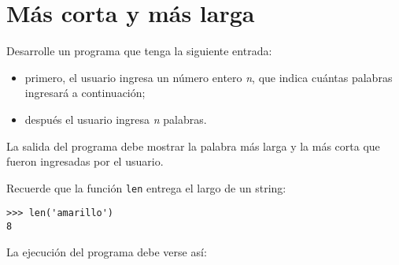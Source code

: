 \section{Más corta y más larga}

Desarrolle un programa que tenga la siguiente entrada:

\begin{itemize}
\item
  primero, el usuario ingresa un número entero \emph{n}, que indica
  cuántas palabras ingresará a continuación;
\item
  después el usuario ingresa \emph{n} palabras.
\end{itemize}

La salida del programa debe mostrar la palabra más larga y la más corta
que fueron ingresadas por el usuario.

Recuerde que la función \lstinline!len! entrega el largo de un string:

\begin{lstlisting}
>>> len('amarillo')
8
\end{lstlisting}

La ejecución del programa debe verse así:
